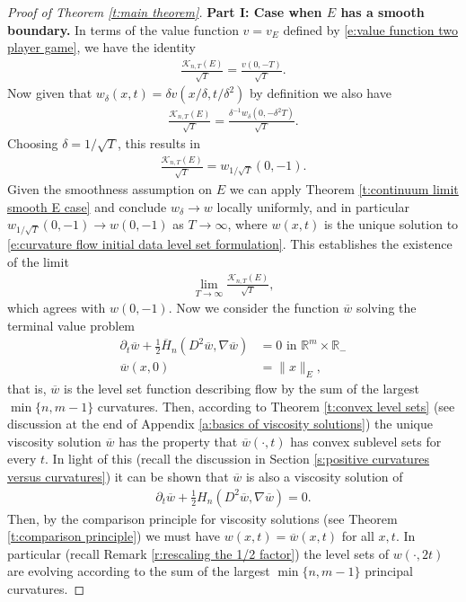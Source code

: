 \documentclass[reqno]{amsart}
\numberwithin{equation}{section}
\begin{document}
\begin{proof}[Proof of Theorem \ref{t:main theorem}]

  \textbf{Part I: Case when $E$ has a smooth boundary.} In terms of the value function $v=v_E$ defined by \eqref{e:value function two player game}, we have the identity
\begin{align*}
  \frac{\mathcal{K}_{n,T}(E)}{\sqrt{T}} = \frac{v(0,-T)}{\sqrt{T}}.    
\end{align*}
Now given that $w_\delta(x,t) = \delta v(x/\delta,t/\delta^2)$ by definition we also have
\begin{align*}
  \frac{\mathcal{K}_{n,T}(E)}{\sqrt{T}}  = \frac{\delta^{-1}w_\delta(0,-\delta^2 T)}{\sqrt{T}}.    
\end{align*}
Choosing $\delta = 1/\sqrt{T}$, this results in
\begin{align*}
  \frac{\mathcal{K}_{n,T}(E)}{\sqrt{T}} = w_{1/\sqrt{T}}(0,-1).    
\end{align*}
Given the smoothness assumption on $E$ we can apply Theorem \ref{t:continuum limit smooth E case} and conclude $w_\delta \to w$ locally uniformly, and in particular $w_{1/\sqrt{T}}(0,-1) \to w(0,-1)$ as $T\to \infty$, where $w(x,t)$ is the unique solution to \eqref{e:curvature flow initial data level set formulation}. This establishes the existence of the limit
\begin{align*}
   \lim_{T\to\infty}\frac{\mathcal{K}_{n,T}(E)}{\sqrt{T}},
\end{align*}
which agrees with $w(0,-1)$. Now we consider the function $\overline w$ solving the terminal value problem
\begin{align*}
  \partial_t \overline w + \tfrac{1}{2}\overline H_n(D^2\overline w,\nabla \overline w) & = 0 \text{ in } \mathbb{R}^m\times \mathbb{R}_-\\
  \overline w(x,0) & = \|x\|_E,
\end{align*}
that is, $\overline w$ is the level set function describing flow by the sum of the largest $\min\{n,m-1\}$ curvatures. Then, according to Theorem \ref{t:convex level sets} (see discussion at the end of Appendix \ref{a:basics of viscosity solutions}) the unique viscosity solution $\overline w$ has the property that $\overline w(\cdot,t)$ has convex sublevel sets for every $t$. In light of this (recall the discussion in Section \ref{s:positive curvatures versus curvatures}) it can be shown that $\overline w$ is also a viscosity solution of 
\begin{align*}
  \partial_t \overline w + \tfrac{1}{2}H_n(D^2\overline w,\nabla \overline w) = 0.
\end{align*}
Then, by the comparison principle for viscosity solutions (see Theorem \ref{t:comparison principle}) we must have $w(x,t) = \overline w(x,t)$ for all $x,t$. In particular (recall Remark \ref{r:rescaling the 1/2 factor}) the level sets of $w(\cdot,2t)$ are evolving according to the sum of the largest $\min\{n,m-1\}$ principal curvatures.


\end{proof}
\end{document}
